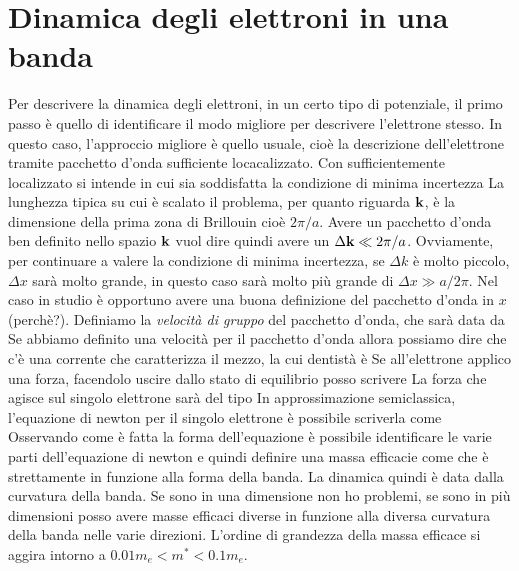\section{Dinamica degli elettroni in una banda}
Per descrivere la dinamica degli elettroni, in un certo tipo di potenziale, il primo passo è quello di identificare il modo migliore per descrivere l'elettrone stesso. In questo caso, l'approccio migliore è quello usuale, cioè la descrizione dell'elettrone tramite pacchetto d'onda sufficiente locacalizzato. Con sufficientemente localizzato si intende 
in cui sia soddisfatta la condizione di minima incertezza
La lunghezza tipica su cui è scalato il problema, per quanto riguarda ${\it\bf k}$, è la dimensione della prima zona di Brillouin cioè $2\pi/a$. Avere un pacchetto d'onda ben definito nello spazio ${\it\bf k}$ vuol dire quindi avere un $\Delta {\it\bf k} \ll 2\pi/a$. Ovviamente, per continuare a valere la condizione di minima incertezza, se $\Delta k$ è molto piccolo, $\Delta x$ sarà molto grande, in questo caso sarà molto più grande di $\Delta x \gg a/2\pi$. Nel caso in studio è opportuno avere una buona definizione del pacchetto d'onda in $x$ (perchè?). Definiamo la \textit{velocità di gruppo} del pacchetto d'onda, che sarà data da
Se abbiamo definito una velocità per il pacchetto d'onda allora possiamo dire che c'è una corrente che caratterizza il mezzo, la cui dentistà è
Se all'elettrone applico una forza, facendolo uscire dallo stato di equilibrio posso scrivere
La forza che agisce sul singolo elettrone sarà del tipo
In approssimazione semiclassica, l'equazione di newton per il singolo elettrone è possibile scriverla come
Osservando come è fatta la forma dell'equazione è possibile identificare le varie parti dell'equazione di newton e quindi definire una massa efficacie come 
che è strettamente in funzione alla forma della banda. La dinamica quindi è data dalla curvatura della banda. Se sono in una dimensione non ho problemi, se sono in più dimensioni posso avere masse efficaci diverse in funzione alla diversa curvatura della banda nelle varie direzioni. L'ordine di grandezza della massa efficace si aggira intorno a $0.01 m_e < m^* < 0.1 m_e$.
